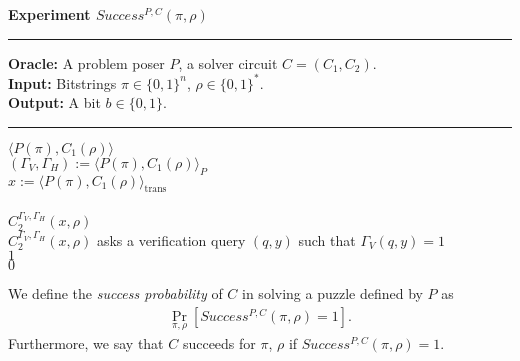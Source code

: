 %
\begin{codeblock}
  \textbf{Experiment $Success^{P, C}(\pi, \rho) $}
  \medskip
  \hrule
  \medskip
  \textbf{Oracle:} A problem poser $P$, a solver circuit $C = (C_1, C_2)$.\\
  \textbf{Input:}  Bitstrings $\pi \in \{0,1\}^n$, $\rho \in \{0,1\}^*$.\\
  \textbf{Output:} A bit $b \in \{0,1\}$.
  \medskip\hrule\medskip
  \Run $\langle P(\pi), C_1(\rho) \rangle$ \\
  \IndI $(\Gamma_V, \Gamma_H) := \langle P(\pi), C_1(\rho) \rangle_{P}$ \\
  \IndI $x := \langle P(\pi), C_1(\rho) \rangle_{\text{trans}}$ \\ \\
  \Run $C_2^{\Gamma_V,\Gamma_H}(x, \rho)$ \\
  \IndI \If $C_2^{\Gamma_V, \Gamma_H}(x, \rho)$ asks a verification query $(q, y)$ such that $\Gamma_V(q, y) = 1$ \Then \\
  \IndII \Return $1$ \\
  \Return $0$ \\
\end{codeblock}
%
We define the \textit{success probability} of $C$ in solving a puzzle defined by $P$ as
\begin{align}
 \underset{\pi, \rho}{\Pr}[Success^{P,C}(\pi, \rho) = 1].
\end{align}
Furthermore, we say that $C$ succeeds for $\pi$, $\rho$ if $Success^{P,C}(\pi, \rho) = 1$.
%
